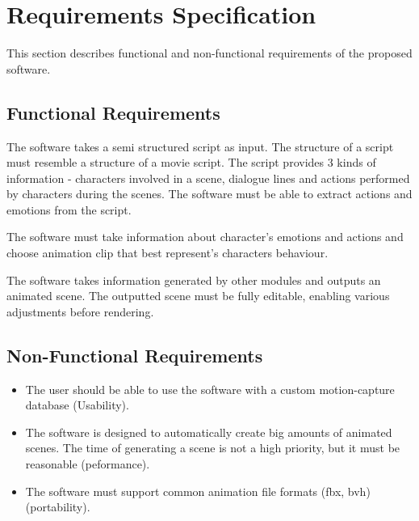 \chapter{Requirements Specification\label{chap:requirements}}

\noindent This section describes functional and non-functional requirements of the proposed software.


\section{Functional Requirements}


\noindent The software takes a semi structured script as input. The structure of a script must resemble a structure of a movie script. The script provides 3 kinds of information - characters involved in a scene, dialogue lines and actions performed by characters during the scenes. The software must be able to extract actions and emotions from the script.

\bigskip


\noindent The software must take information about character's emotions and actions and choose animation clip that best represent's characters behaviour.

\bigskip


\noindent The software takes information generated by other modules and outputs an animated scene. The outputted scene must be fully editable, enabling various adjustments before rendering.


\section{Non-Functional Requirements}

\begin{itemize}
\item The user should be able to use the software with a custom motion-capture database (Usability).
\item The software is designed to automatically create big amounts of animated scenes. The time of generating a scene is not a high priority, but it must be reasonable (peformance).
\item The software must support common animation file formats (fbx, bvh) (portability).
\end{itemize}
